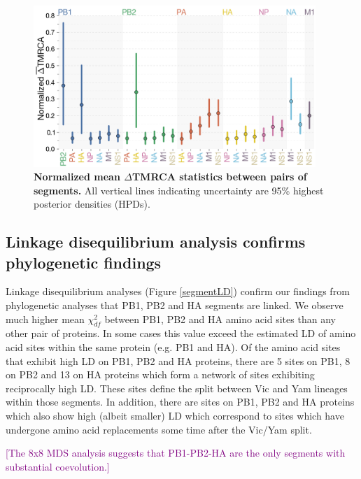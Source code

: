 \documentclass[11pt,oneside,letterpaper]{article}
\def\tbc#1{\textcolor{purple}{[#1]}}
\begin{document}
\begin{figure}
	\centering		
	\includegraphics[width=0.95\textwidth]{figures/InfB_normalizedMuDeltaTMRCA.png}
	\caption{\textbf{Normalized mean $\Delta$TMRCA statistics between pairs of segments.}
All vertical lines indicating uncertainty are 95\% highest posterior densities (HPDs).}
	\label{deltaTMRCA}
\end{figure}

\subsection*{Linkage disequilibrium analysis confirms phylogenetic findings}
Linkage disequilibrium analyses (Figure \ref{segmentLD}) confirm our findings from phylogenetic analyses that PB1, PB2 and HA segments are linked.
We observe much higher mean $\chi^{2}_{df}$ between PB1, PB2 and HA amino acid sites than any other pair of proteins.
In some cases this value exceed the estimated LD of amino acid sites within the same protein (e.g. PB1 and HA).
Of the amino acid sites that exhibit high LD on PB1, PB2 and HA proteins, there are 5 sites on PB1, 8 on PB2 and 13 on HA proteins which form a network of sites exhibiting reciprocally high LD.
These sites define the split between Vic and Yam lineages within those segments.
In addition, there are sites on PB1, PB2 and HA proteins which also show high (albeit smaller) LD which correspond to sites which have undergone amino acid replacements some time after the Vic/Yam split.


\tbc{The 8x8 MDS analysis suggests that PB1-PB2-HA are the only segments with substantial coevolution.}
\end{document}
